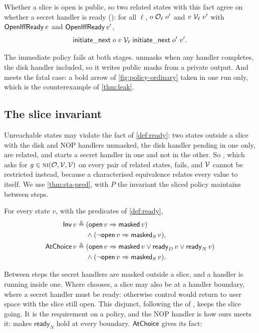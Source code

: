 Whether a slice is open is public, so two related states with this fact agree on
whether a secret handler is ready (): for all $\ell$,
$o \mathrel{\mathcal{O}_\ell} o'$ and $v \mathrel{\mathcal{V}_\ell} v'$ with $\mathsf{OpenIffReady}\,v$ and $\mathsf{OpenIffReady}\,v'$,
\[
\mathsf{initiate\_next}\;o\;v \mathrel{\mathcal{V}_\ell} \mathsf{initiate\_next}\;o'\;v'.
\]

The immediate policy fails at both stages.
 unmasks when any handler completes, the disk
handler included, so it writes public masks from a private output. And
 meets the fatal case: a bold arrow of \cref{fig:policy-ordinary}
taken in one run only, which is the counterexample of \cref{thm:leak}.

\subsection{The slice invariant}\label{sec:invariant}

Unreachable states may violate the fact of \cref{def:ready}: two
states outside a slice with the disk and NOP handlers unmasked, the disk handler
pending in one only, are related, and  starts a secret
handler in one and not in the other. So , which asks for
$g \in \text{\normalfont\scshape ni}(\mathcal{O},\mathcal{V},\mathcal{V})$ on every pair of related states, fails, and $\mathcal{V}$ cannot
be restricted instead, because a characterised equivalence relates every value to
itself. We use \cref{thm:sta-pred}, with $P$ the invariant the sliced policy
maintains between steps.

\begin{definition}\label{def:gated}
For every state $v$, with the predicates of \cref{def:ready},
\begin{align*}
\mathsf{Inv}\,v \triangleq{}& (\mathsf{open}\,v \Rightarrow \mathsf{masked}\,v) \\
&\wedge (\neg\mathsf{open}\,v \Rightarrow \mathsf{masked}_S\,v), \\
\mathsf{AtChoice}\,v \triangleq{}& (\mathsf{open}\,v \Rightarrow \mathsf{masked}\,v \vee
  \mathsf{ready}_D\,v \vee \mathsf{ready}_N\,v) \\
&\wedge (\neg\mathsf{open}\,v \Rightarrow \mathsf{masked}_S\,v).
\end{align*}
\end{definition}

Between steps the secret handlers are masked outside a slice, and a
handler is running inside one. Where  chooses, a slice may also be at
a handler boundary, where a secret handler must be ready: otherwise control would
return to user space with the slice still open. This disjunct, following the
 of , keeps the slice going. It is the requirement on a
policy, and the NOP handler is how ours meets it: 
makes $\mathsf{ready}_N$ hold at every boundary. $\mathsf{AtChoice}$ gives  its
fact:

